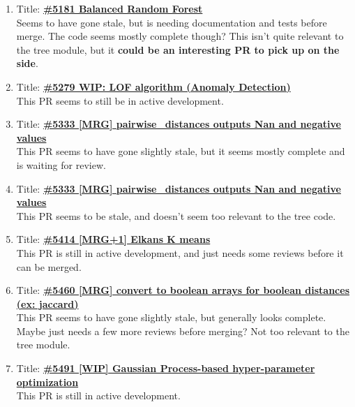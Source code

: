 \documentclass[12pt, oneside]{article}
\begin{document}
\begin{enumerate}
  \item
  Title:
  \textbf{\href{https://github.com/scikit-learn/scikit-learn/pull/5181}
    {\#5181 Balanced Random Forest}}\\
  Seems to have gone stale, but is needing documentation and tests
  before merge. The code seems mostly complete though? This isn't
  quite relevant to the tree module, but it \textbf{could be an
    interesting PR to pick up on the side}.

  \item
  Title:
  \textbf{\href{https://github.com/scikit-learn/scikit-learn/pull/5279}
    {\#5279 WIP: LOF algorithm (Anomaly Detection)}}\\
  This PR seems to still be in active development.

  \item
  Title:
  \textbf{\href{https://github.com/scikit-learn/scikit-learn/pull/5333}
    {\#5333 [MRG] pairwise\_distances outputs Nan and negative values}}\\
  This PR seems to have gone slightly stale, but it seems mostly
  complete and is waiting for review.

  \item
  Title:
  \textbf{\href{https://github.com/scikit-learn/scikit-learn/pull/5382}
    {\#5333 [MRG] pairwise\_distances outputs Nan and negative values}}\\
  This PR seems to be stale, and doesn't seem too relevant to the tree code.

  \item
  Title:
  \textbf{\href{https://github.com/scikit-learn/scikit-learn/pull/5414}
    {\#5414 [MRG+1] Elkans K means}}\\
  This PR is still in active development, and just needs some reviews
  before it can be merged.

  \item
  Title:
  \textbf{\href{https://github.com/scikit-learn/scikit-learn/pull/5460}
    {\#5460 [MRG] convert to boolean arrays for boolean distances (ex: jaccard)}}\\
  This PR seems to have gone slightly stale, but generally looks
  complete. Maybe just needs a few more reviews before merging? Not
  too relevant to the tree module.

  \item
  Title:
  \textbf{\href{https://github.com/scikit-learn/scikit-learn/pull/5491}
    {\#5491 [WIP] Gaussian Process-based hyper-parameter optimization}}\\
  This PR is still in active development.


\end{enumerate}
\end{document}
